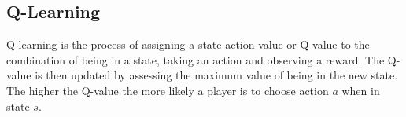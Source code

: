 \documentclass[a0,landscape]{a0poster}
\begin{document}
\begin{multicols}{3}
\section*{Q-Learning}
Q-learning is the process of assigning a state-action value or Q-value to the combination of being in a state, taking an action and observing a reward.
The Q-value is then updated by assessing the maximum value of being in the new state.
The higher the Q-value the more likely a player is to choose action $a$ when in state $s$.


\end{multicols}
\end{document}
